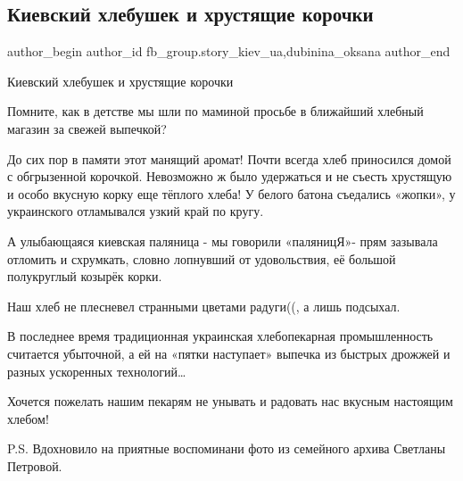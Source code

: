  
 
 
 
 
 
\subsection{Киевский хлебушек и хрустящие корочки}
\label{sec:14_02_2022.fb.fb_group.story_kiev_ua.2.kievskij_hlebushek}
 
\ifcmt
 author_begin
   author_id fb_group.story_kiev_ua,dubinina_oksana
 author_end
\fi

Киевский хлебушек и хрустящие корочки


Помните, как в детстве мы шли по маминой просьбе в ближайший хлебный магазин за
свежей выпечкой?

До сих пор в памяти этот манящий аромат! Почти всегда хлеб приносился домой с
обгрызенной корочкой. Невозможно ж было удержаться и не съесть хрустящую и
особо вкусную корку еще тёплого хлеба! У белого батона съедались «жопки», у
украинского отламывался узкий край по кругу.  

А улыбающаяся киевская паляница - мы говорили «паляницЯ»- прям зазывала
отломить и схрумкать, словно лопнувший от удовольствия, её большой полукруглый
козырёк корки.

Наш хлеб не плесневел странными цветами радуги((, а лишь подсыхал.

В последнее время традиционная украинская хлебопекарная промышленность
считается убыточной, а ей на «пятки наступает» выпечка из быстрых дрожжей и
разных ускоренных технологий… 

Хочется пожелать нашим пекарям не унывать и радовать нас вкусным настоящим
хлебом!

P.S. Вдохновило на приятные воспоминани фото из семейного архива Светланы
Петровой.

